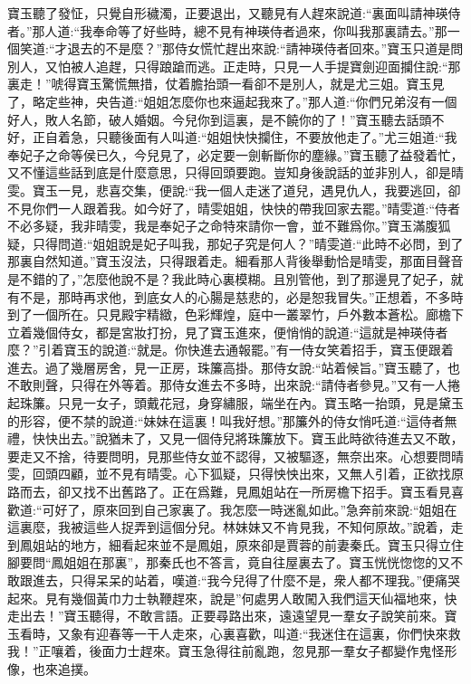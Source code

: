 \begin{parag}
    寶玉聽了發怔，只覺自形穢濁，正要退出，又聽見有人趕來說道:“裏面叫請神瑛侍者。”那人道:“我奉命等了好些時，總不見有神瑛侍者過來，你叫我那裏請去。”那一個笑道:“才退去的不是麼？”那侍女慌忙趕出來說:“請神瑛侍者回來。”寶玉只道是問別人，又怕被人追趕，只得踉蹌而逃。正走時，只見一人手提寶劍迎面攔住說:“那裏走！”唬得寶玉驚慌無措，仗着膽抬頭一看卻不是別人，就是尤三姐。寶玉見了，略定些神，央告道:“姐姐怎麼你也來逼起我來了。”那人道:“你們兄弟沒有一個好人，敗人名節，破人婚姻。今兒你到這裏，是不饒你的了！”寶玉聽去話頭不好，正自着急，只聽後面有人叫道:“姐姐快快攔住，不要放他走了。”尤三姐道:“我奉妃子之命等侯已久，今兒見了，必定要一劍斬斷你的塵緣。”寶玉聽了益發着忙，又不懂這些話到底是什麼意思，只得回頭要跑。豈知身後說話的並非別人，卻是晴雯。寶玉一見，悲喜交集，便說:“我一個人走迷了道兒，遇見仇人，我要逃回，卻不見你們一人跟着我。如今好了，晴雯姐姐，快快的帶我回家去罷。”晴雯道:“侍者不必多疑，我非晴雯，我是奉妃子之命特來請你一會，並不難爲你。”寶玉滿腹狐疑，只得問道:“姐姐說是妃子叫我，那妃子究是何人？”晴雯道:“此時不必問，到了那裏自然知道。”寶玉沒法，只得跟着走。細看那人背後舉動恰是晴雯，那面目聲音是不錯的了，”怎麼他說不是？我此時心裏模糊。且別管他，到了那邊見了妃子，就有不是，那時再求他，到底女人的心腸是慈悲的，必是恕我冒失。”正想着，不多時到了一個所在。只見殿宇精緻，色彩輝煌，庭中一叢翠竹，戶外數本蒼松。廊檐下立着幾個侍女，都是宮妝打扮，見了寶玉進來，便悄悄的說道:“這就是神瑛侍者麼？”引着寶玉的說道:“就是。你快進去通報罷。”有一侍女笑着招手，寶玉便跟着進去。過了幾層房舍，見一正房，珠簾高掛。那侍女說:“站着候旨。”寶玉聽了，也不敢則聲，只得在外等着。那侍女進去不多時，出來說:“請侍者參見。”又有一人捲起珠簾。只見一女子，頭戴花冠，身穿繡服，端坐在內。寶玉略一抬頭，見是黛玉的形容，便不禁的說道:“妹妹在這裏！叫我好想。”那簾外的侍女悄吒道:“這侍者無禮，快快出去。”說猶未了，又見一個侍兒將珠簾放下。寶玉此時欲待進去又不敢，要走又不捨，待要問明，見那些侍女並不認得，又被驅逐，無奈出來。心想要問晴雯，回頭四顧，並不見有晴雯。心下狐疑，只得怏怏出來，又無人引着，正欲找原路而去，卻又找不出舊路了。正在爲難，見鳳姐站在一所房檐下招手。寶玉看見喜歡道:“可好了，原來回到自己家裏了。我怎麼一時迷亂如此。”急奔前來說:“姐姐在這裏麼，我被這些人捉弄到這個分兒。林妹妹又不肯見我，不知何原故。”說着，走到鳳姐站的地方，細看起來並不是鳳姐，原來卻是賈蓉的前妻秦氏。寶玉只得立住腳要問“鳳姐姐在那裏”，那秦氏也不答言，竟自往屋裏去了。寶玉恍恍惚惚的又不敢跟進去，只得呆呆的站着，嘆道:“我今兒得了什麼不是，衆人都不理我。”便痛哭起來。見有幾個黃巾力士執鞭趕來，說是”何處男人敢闖入我們這天仙福地來，快走出去！”寶玉聽得，不敢言語。正要尋路出來，遠遠望見一羣女子說笑前來。寶玉看時，又象有迎春等一干人走來，心裏喜歡，叫道:“我迷住在這裏，你們快來救我！”正嚷着，後面力士趕來。寶玉急得往前亂跑，忽見那一羣女子都變作鬼怪形像，也來追撲。
\end{parag}


